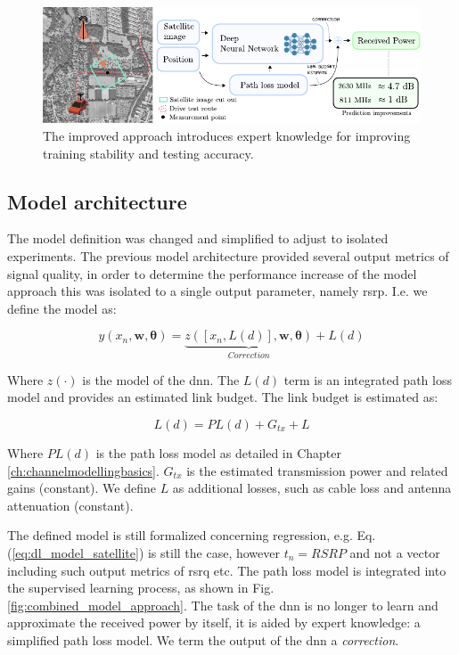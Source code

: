 \begin{figure}
    \centering
    \includegraphics{chapters/part_pathloss/model_aided_paper/version2_approach_figure.pdf}
    \caption{The improved approach introduces expert knowledge for improving training stability and testing accuracy.}
    \label{fig:my_label}
\end{figure}

\subsection{Model architecture}
The model definition was changed and simplified to adjust to isolated experiments. The previous model architecture provided several output metrics of signal quality, in order to determine the performance increase of the model approach this was isolated to a single output parameter, namely \gls{rsrp}. I.e. we define the model as:

\begin{equation}\label{eq:model}
    y(x_n, \mathbf{w}, \bm{\theta}) = \underbrace{z([x_n, L(d)], \mathbf{w}, \bm{\theta})}_{Correction} + L(d)
\end{equation}

Where $z(\cdot)$ is the model of the \gls{dnn}. The $L(d)$ term is an integrated path loss model and provides an estimated link budget. The link budget is estimated as:

\begin{equation}\label{eq:path_loss_model_linkbudget}
L(d) = PL(d) + G_{tx} + L
\end{equation}

Where $PL(d)$ is the  path loss model as detailed in Chapter \ref{ch:channelmodellingbasics}. $G_{tx}$ is the estimated transmission power and related gains (constant). We define $L$ as additional losses, such as cable loss and antenna attenuation (constant). 

The defined model is still formalized concerning regression, e.g. Eq. (\ref{eq:dl_model_satellite}) is still the case, however $t_n = RSRP$ and not a vector including such output metrics of \gls{rsrq} etc. The path loss model is integrated into the supervised learning process, as shown in Fig. \ref{fig:combined_model_approach}. The task of the \gls{dnn} is no longer to learn and approximate the received power by itself, it is aided by expert knowledge: a simplified path loss model. We term the output of the \gls{dnn} a \emph{correction}.


